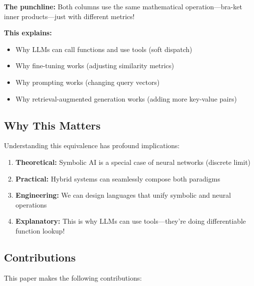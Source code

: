 \documentclass[11pt,a4paper]{article}
\theoremstyle{definition}
\begin{document}
\textbf{The punchline:} Both columns use the same mathematical operation---bra-ket inner products---just with different metrics!

\textbf{This explains:}
\begin{itemize}
\item Why LLMs can call functions and use tools (soft dispatch)
\item Why fine-tuning works (adjusting similarity metrics)
\item Why prompting works (changing query vectors)
\item Why retrieval-augmented generation works (adding more key-value pairs)
\end{itemize}

\subsection{Why This Matters}

Understanding this equivalence has profound implications:

\begin{enumerate}
\item \textbf{Theoretical:} Symbolic AI is a special case of neural networks (discrete limit)
\item \textbf{Practical:} Hybrid systems can seamlessly compose both paradigms
\item \textbf{Engineering:} We can design languages that unify symbolic and neural operations
\item \textbf{Explanatory:} This is why LLMs can use tools---they're doing differentiable function lookup!
\end{enumerate}

\subsection{Contributions}

This paper makes the following contributions:
\end{document}
